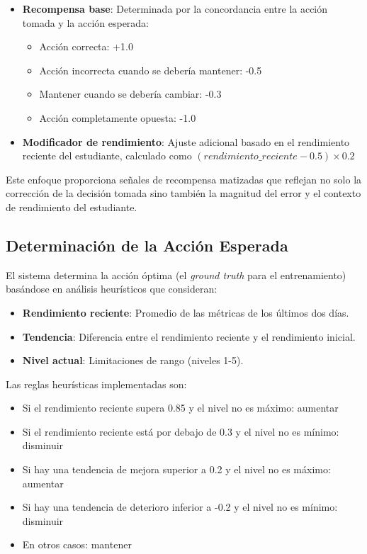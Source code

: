 \begin{itemize}
    \item \textbf{Recompensa base}: Determinada por la concordancia entre la acción tomada y la acción esperada:
    \begin{itemize}
        \item Acción correcta: +1.0
        \item Acción incorrecta cuando se debería mantener: -0.5
        \item Mantener cuando se debería cambiar: -0.3
        \item Acción completamente opuesta: -1.0
    \end{itemize}
    
    \item \textbf{Modificador de rendimiento}: Ajuste adicional basado en el rendimiento reciente del estudiante, calculado como $(rendimiento\_reciente - 0.5) \times 0.2$
\end{itemize}

Este enfoque proporciona señales de recompensa matizadas que reflejan no solo la corrección de la decisión tomada sino también la magnitud del error y el contexto de rendimiento del estudiante.


\subsection{Determinación de la Acción Esperada}
\label{determinacion-accion-esperada}

El sistema determina la acción óptima (el \textit{ground truth} para el entrenamiento) basándose en análisis heurísticos que consideran:

\begin{itemize}
    \item \textbf{Rendimiento reciente}: Promedio de las métricas de los últimos dos días.
    \item \textbf{Tendencia}: Diferencia entre el rendimiento reciente y el rendimiento inicial.
    \item \textbf{Nivel actual}: Limitaciones de rango (niveles 1-5).
\end{itemize}

Las reglas heurísticas implementadas son:

\begin{itemize}
    \item Si el rendimiento reciente supera 0.85 y el nivel no es máximo: aumentar
    \item Si el rendimiento reciente está por debajo de 0.3 y el nivel no es mínimo: disminuir
    \item Si hay una tendencia de mejora superior a 0.2 y el nivel no es máximo: aumentar
    \item Si hay una tendencia de deterioro inferior a -0.2 y el nivel no es mínimo: disminuir
    \item En otros casos: mantener
\end{itemize}


